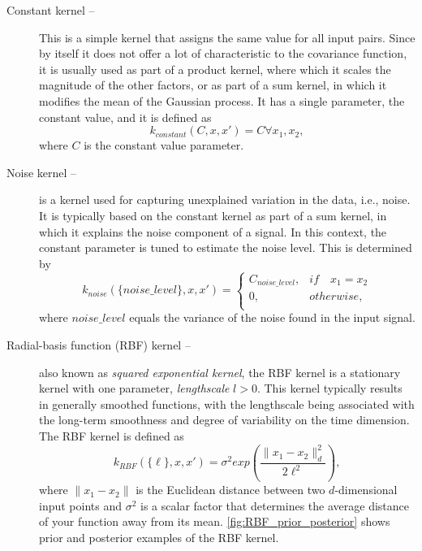 \begin{description}
	\item[Constant kernel -- ]
	This is a simple kernel that assigns the same value for all input pairs.
	Since by itself it does not offer a lot of characteristic to the covariance function, it is usually used as part of a product kernel, where which it scales the magnitude of the other factors, or as part of a sum kernel, in which it modifies the mean of the Gaussian process.
	It has a single parameter, the constant value, and it is defined as 
	\begin{equation}
		\label{eq:constant_kernel}
		k_{constant}(C, x, x') = C\forall x_1, x_2,
	\end{equation}
	where $C$ is the constant value parameter.
	
	\item[Noise kernel -- ]
	is a kernel used for capturing unexplained variation in the data, i.e., noise.
	It is typically based on the constant kernel as part of a sum kernel, in which it explains the noise component of a signal.
	In this context, the constant parameter is tuned to estimate the noise level.
	This is determined by
	\begin{equation}
		\label{eq:noise_kernel}
		k_{noise}(\{noise\_level\}, x, x') =
		\begin{cases}
		C_{noise\_level}, & if\quad x_1 = x_2\\
		0, & otherwise,\\
		\end{cases}
	\end{equation}
	where $noise\_level$ equals the variance of the noise found in the input signal.
	
	\item[Radial-basis function (RBF) kernel --]
	also known as \emph{squared exponential kernel}, the RBF kernel is a stationary kernel with one parameter, \emph{lengthscale} $l > 0$.
	This kernel typically results in generally smoothed functions, with the lengthscale being associated with the long-term smoothness and degree of variability on the time dimension.
	The RBF kernel is defined as
	\begin{equation}
		\label{eq:RBF_kernel}
		k_{RBF}(\{\ell\}, x, x') = \sigma^2 exp\left(\frac{\lVert x_1 - x_2 \lVert ^2_d}{2\ell^2}\right),
	\end{equation}
	where $\lVert x_1 - x_2 \lVert$ is the Euclidean distance between two $d$-dimensional input points and $\sigma^2$ is a scalar factor that determines the average distance of your function away from its mean.
	\cref{fig:RBF_prior_posterior} shows prior and posterior examples of the RBF kernel.
	

\end{description}
